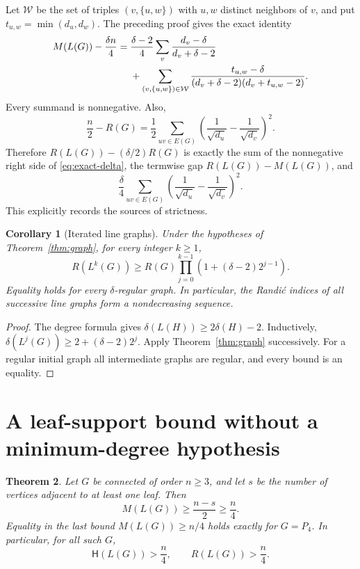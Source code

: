 \documentclass[11pt]{article}
\newtheorem{theorem}{Theorem}[section]
\newtheorem{corollary}[theorem]{Corollary}
\theoremstyle{remark}\newtheorem{remark}[theorem]{Remark}
\newcommand{\W}{\mathcal W}
\begin{document}
Let $\W$ be the set of triples $(v,\{u,w\})$ with $u,w$ distinct neighbors
of $v$, and put $t_{u,w}=\min(d_u,d_w)$. The preceding proof gives the exact
identity
\begin{align}
 M(L(G))-\frac{\delta n}{4}
 ={}&\frac{\delta-2}{4}\sum_v\frac{d_v-\delta}{d_v+\delta-2}\notag\\
 &+\sum_{(v,\{u,w\})\in\W}
 \frac{t_{u,w}-\delta}
 {(d_v+\delta-2)(d_v+t_{u,w}-2)}.\label{eq:exact-delta}
\end{align}
Every summand is nonnegative. Also,
\[
 \frac n2-R(G)
 =\frac12\sum_{uv\in E(G)}
       \left(\frac1{\sqrt{d_u}}-\frac1{\sqrt{d_v}}\right)^2.
\]
Therefore $R(L(G))-(\delta/2)R(G)$ is exactly the sum of the
nonnegative right side of \eqref{eq:exact-delta}, the termwise gap
$R(L(G))-M(L(G))$, and
\[
 \frac\delta4\sum_{uv\in E(G)}
       \left(\frac1{\sqrt{d_u}}-\frac1{\sqrt{d_v}}\right)^2.
\]
This explicitly records the sources of strictness.

\begin{corollary}[Iterated line graphs]
Under the hypotheses of Theorem~\ref{thm:graph}, for every integer $k\ge1$,
\[
 R(L^k(G))\ge R(G)\prod_{j=0}^{k-1}
 \left(1+(\delta-2)2^{j-1}\right).
\]
Equality holds for every $\delta$-regular graph. In particular, the Randi\'c
indices of all successive line graphs form a nondecreasing sequence.
\end{corollary}
\begin{proof}
The degree formula gives $\delta(L(H))\ge2\delta(H)-2$.
Inductively, $\delta(L^j(G))\ge2+(\delta-2)2^j$. Apply
Theorem~\ref{thm:graph} successively. For a regular initial graph all
intermediate graphs are regular, and every bound is an equality.
\end{proof}

\section{A leaf-support bound without a minimum-degree hypothesis}

\begin{theorem}\label{thm:support}
Let $G$ be connected of order $n\ge3$, and let $s$ be the number of
vertices adjacent to at least one leaf. Then
\begin{equation}\label{eq:support}
 M(L(G))\ge\frac{n-s}{2}\ge\frac n4.
\end{equation}
Equality in the last bound $M(L(G))\ge n/4$ holds exactly for $G=P_4$.
In particular, for all such $G$,
\[
 \mathsf H(L(G))>\frac n4,\qquad R(L(G))>\frac n4.
\]
\end{theorem}
\end{document}
